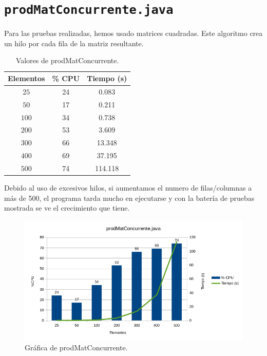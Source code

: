 \documentclass[12pt,letterpaper]{article}
\begin{document}
\newpage
\section{\texttt{prodMatConcurrente.java}}

Para las pruebas realizadas, hemos usado matrices cuadradas. Este algoritmo crea un hilo por cada fila de la matriz resultante.
\begin{center}
	\begin{table}[htbp]
		\begin{center}
			\begin{tabular}{|c|c|c|}
				\hline
				\textbf{Elementos} & \textbf{\% CPU} & \textbf{Tiempo (s)}  \\
				\hline 
				$25$ & 24 & 0.083\\ \hline
				$50$ & 17 & 0.211\\ \hline
				$100$ & 34 & 0.738\\ \hline	
				$200$ & 53 & 3.609 \\ \hline 
				$300$ & 66 & 13.348 \\ \hline 
				$400$ & 69 & 37.195 \\ \hline 
				$500$ & 74 & 114.118\\ \hline
			\end{tabular}
			\caption{Valores de prodMatConcurrente.}
			\label{tabla:Valores de prodMatConcurrente}
		\end{center}
	\end{table}
\end{center}

Debido al uso de excesivos hilos, si aumentamos el numero de filas/columnas a más de 500, el programa tarda mucho en ejecutarse y con la batería de pruebas mostrada se ve el crecimiento que tiene.
\begin{figure}[h]
	\begin{center}
		\includegraphics[scale=0.8]{prodMatConcurrente.png}
		\caption{Gráfica de prodMatConcurrente.}
		\label{fig: Gráfica de prodMatConcurrente}
	\end{center}	
\end{figure}
\end{document}
